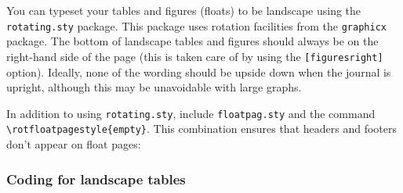 \documentclass{cje}          %
\theoremstyle{plain}%
\theoremstyle{definition}
\theoremstyle{remark}
\begin{document}
You can typeset your tables and figures (floats) to be landscape using the \texttt{rotating.sty} package. This package uses rotation facilities from the \texttt{graphicx} package. The bottom of landscape tables and figures should always be on the right-hand side of the page (this is taken care of by using the \verb"[figuresright]" option). Ideally, none of the wording should be upside down when the journal is upright, although this may be unavoidable with large graphs.

In addition to using \texttt{rotating.sty}, include \texttt{floatpag.sty} and the command \verb"\rotfloatpagestyle{empty}". This combination ensures that headers and footers don't appear on float pages:
\begin{smallverbatim}
\usepackage[figuresright]{rotating}
\usepackage{floatpag}
\end{smallverbatim}

\subsubsection{Coding for landscape tables}
\label{landtables}
\end{document}
